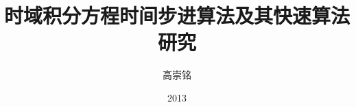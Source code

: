 \documentclass[bachelor]{uestcthesis}
\title{时域积分方程时间步进算法及其快速算法研究}
\author{高崇铭}
\date{2013}{4}{15}
\begin{document}
\newcommand{\red}[1]{{\textcolor{red}{{} #1}}}
\newcommand{\ud}{\,\mathrm{d}}
\newcommand{\bt}{\vrule width 0.85pt}




\end{document}
